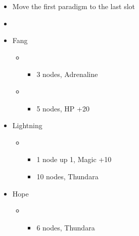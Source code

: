 	\begin{menu}
		\begin{itemize}
			\paradigm
			\begin{itemize}
				\item Move the first paradigm to the last slot
				\item {}%
				      {\paradigmline{[\com]}{\com}{\rav}}
				      {\paradigmline{\com}{\rav}{(\rav)}}%
				      {\paradigmline[3]{\textit{(\sab)}}{\textit{(\rav)}}{\textit{\rav}}}%
				      {\paradigmline{\sen}{(\rav)}{(\rav)}}%
				      {\paradigmline{\sab}{(\rav)}{\syn}}%
				      {\paradigmline{\com}{\rav}{\rav}}
			\end{itemize}
			\crystarium
			\begin{itemize}
				\item Fang
				      \begin{itemize}
					      \item \com
					            \begin{itemize}
						            \item 3 nodes, Adrenaline
					            \end{itemize}
					      \item \sab
					            \begin{itemize}
						            \item 5 nodes, HP +20
					            \end{itemize}
				      \end{itemize}
				\item Lightning
				      \begin{itemize}
					      \item \rav
					            \begin{itemize}
						            \item 1 node up 1, Magic +10
						            \item 10 nodes, Thundara
					            \end{itemize}
				      \end{itemize}
				\item Hope
				      \begin{itemize}
					      \item \rav
					            \begin{itemize}
						            \item 6 nodes, Thundara
					            \end{itemize}
				      \end{itemize}

\end{itemize}
\end{itemize}
\end{menu}
